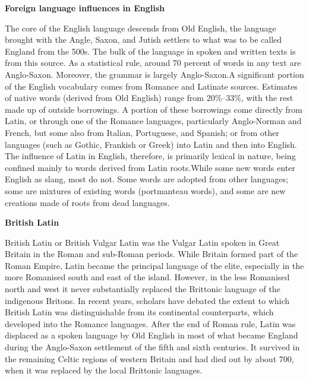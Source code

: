 \documentclass[11pt]{scrartcl} %
\begin{document}
\noindent \textbf{Foreign language influences in English} \par

The core of the English language descends from Old English, the language brought with the Angle, Saxon, and Jutish settlers to what was to be called England from the 500s. The bulk of the language in spoken and written texts is from this source. As a statistical rule, around 70 percent of words in any text are Anglo-Saxon. Moreover, the grammar is largely Anglo-Saxon.A significant portion of the English vocabulary comes from Romance and Latinate sources. Estimates of native words (derived from Old English) range from 20\%–33\%, with the rest made up of outside borrowings. A portion of these borrowings come directly from Latin, or through one of the Romance languages, particularly Anglo-Norman and French, but some also from Italian, Portuguese, and Spanish; or from other languages (such as Gothic, Frankish or Greek) into Latin and then into English. The influence of Latin in English, therefore, is primarily lexical in nature, being confined mainly to words derived from Latin roots.While some new words enter English as slang, most do not. Some words are adopted from other languages; some are mixtures of existing words (portmanteau words), and some are new creations made of roots from dead languages. \par

\noindent \textbf{British Latin} \par

British Latin or British Vulgar Latin was the Vulgar Latin spoken in Great Britain in the Roman and sub-Roman periods. While Britain formed part of the Roman Empire, Latin became the principal language of the elite, especially in the more Romanised south and east of the island. However, in the less Romanised north and west it never substantially replaced the Brittonic language of the indigenous Britons. In recent years, scholars have debated the extent to which British Latin was distinguishable from its continental counterparts, which developed into the Romance languages. After the end of Roman rule, Latin was displaced as a spoken language by Old English in most of what became England during the Anglo-Saxon settlement of the fifth and sixth centuries. It survived in the remaining Celtic regions of western Britain and had died out by about 700, when it was replaced by the local Brittonic languages.
\end{document}
